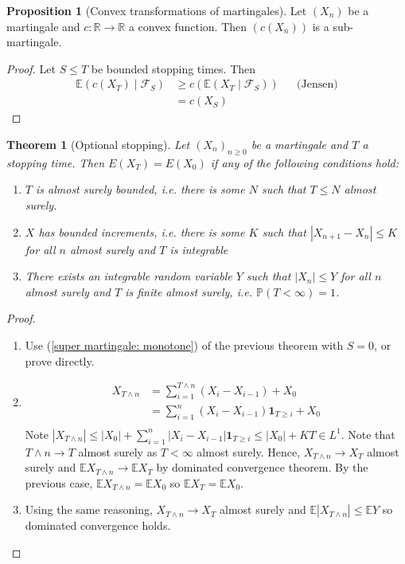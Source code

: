 \documentclass[parskip=full]{article}
\newtheorem{theorem}{Theorem}[section]
\theoremstyle{definition}
\newtheorem{proposition}{Proposition}[section]
\newcommand{\R}{\mathbb{R}}
\newcommand{\Pbb}{\mathbb{P}}
\newcommand{\1}{\mathbbm{1}}
\newcommand{\E}{\mathbb{E}}
\begin{document}
\begin{proposition}[Convex transformations of martingales]
  Let $(X_n)$ be a martingale and $c: \R \to \R$ a convex function. Then $(c(X_n))$ is a sub-martingale.
\end{proposition}

\begin{proof}
  Let $S \leq T$ be bounded stopping times. Then
  \begin{align*}
    \E(c(X_T) \mid \mathcal{F}_S) & \geq c(\E(X_T \mid \mathcal{F}_S)) &   & \text{(Jensen)} \\
                                  & = c(X_S)                          
  \end{align*}
\end{proof}

\begin{theorem}[Optional stopping]
  Let $(X_n)_{n \geq 0}$ be a martingale and $T$ a stopping time. Then $E(X_T) = E(X_0)$ if any of the following conditions hold:
  \begin{enumerate}
    \item $T$ is almost surely bounded, i.e. there is some $N$ such that $T \leq N$ almost surely.
    \item $X$ has bounded increments, i.e. there is some $K$ such that $|X_{n+1} - X_n| \leq K$ for all $n$ almost surely and $T$ is integrable
    \item There exists an integrable random variable $Y$ such that $|X_n| \leq Y$ for all $n$ almost surely and $T$ is finite almost surely, i.e. $\Pbb(T < \infty) = 1$.
  \end{enumerate}
\end{theorem}

\begin{proof}
  \begin{enumerate}
    \item Use (\ref{super martingale: monotone}) of the previous theorem with $S = 0$, or prove directly.
    \item \begin{align*}
      X_{T \wedge n} &= \sum_{i=1}^{T \wedge n} (X_i - X_{i-1}) + X_0 \\
      &= \sum_{i=1}^n (X_i - X_{i-1}) \mathbf{1}_{T \geq i} + X_0\\ 
    \end{align*}
    Note $|X_{T \wedge n}| \leq |X_0| + \sum_{i=1}^n |X_i - X_{i-1}| \mathbf{1}_{T \geq i} \leq |X_0| + K T \in L^1$. Note that $T \wedge n \to T$ almost surely as $T < \infty$ almost surely. Hence, $X_{T \wedge n} \to X_T$ almost surely and $\E X_{T \wedge n} \to \E X_T$ by dominated convergence theorem. By the previous case, $\E X_{T \wedge n} = \E X_0$ so $\E X_T = \E X_0$.
    \item Using the same reasoning, $X_{T \wedge n} \to X_T$ almost surely and $\E |X_{T \wedge n}| \leq \E Y$ so dominated convergence holds.
  \end{enumerate}
\end{proof}
\end{document}
